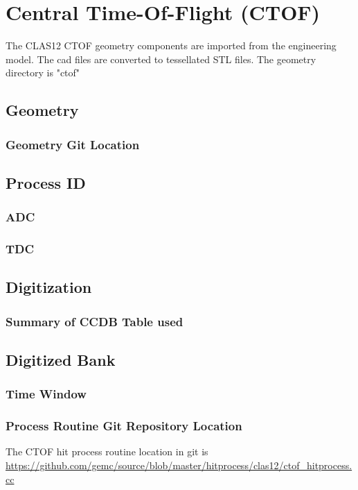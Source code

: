 \section{Central Time-Of-Flight (CTOF)}

The CLAS12 CTOF geometry components are imported from the engineering model. The cad files are converted to tessellated STL files.
The geometry directory is "ctof"

\subsection{Geometry}

\subsubsection{Geometry Git Location}

\subsection{Process ID}
\subsubsection{ADC}
\subsubsection{TDC}

\subsection{Digitization}


\subsubsection{Summary of CCDB Table used}

\subsection{Digitized Bank}

\subsubsection{Time Window}

\subsubsection{Process Routine Git Repository Location}


The CTOF hit process routine location in git is \url{https://github.com/gemc/source/blob/master/hitprocess/clas12/ctof_hitprocess.cc}
